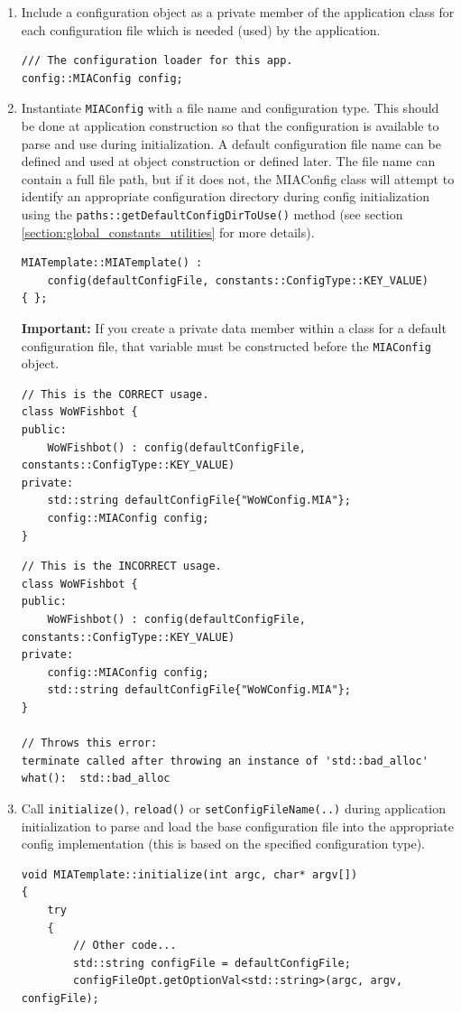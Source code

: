\begin{enumerate}
	\item Include a configuration object as a private member of the application class for each configuration file which is needed (used) by the application.
	\begin{lstlisting}[style=cppstyle]
/// The configuration loader for this app.
config::MIAConfig config;
	\end{lstlisting}
	\item Instantiate \texttt{MIAConfig} with a file name and configuration type. This should be done at application construction so that the configuration is available to parse and use during initialization. A default configuration file name can be defined and used at object construction or defined later. The file name can contain a full file path, but if it does not, the MIAConfig class will attempt to identify an appropriate configuration directory during config initialization using the \texttt{paths::getDefaultConfigDirToUse()} method (see section \ref{section:global_constants_utilities} for more details).
	\begin{lstlisting}[style=cppstyle]
MIATemplate::MIATemplate() : 
	config(defaultConfigFile, constants::ConfigType::KEY_VALUE)                      
{ };
	\end{lstlisting}
	\textbf{Important:} If you create a private data member within a class for a default configuration file, that variable must be constructed before the \texttt{MIAConfig} object.
	\begin{lstlisting}[style=cppstyle]
// This is the CORRECT usage.
class WoWFishbot {
public:
	WoWFishbot() : config(defaultConfigFile, constants::ConfigType::KEY_VALUE)
private:
	std::string defaultConfigFile{"WoWConfig.MIA"};
	config::MIAConfig config;
}
	\end{lstlisting}
	\begin{lstlisting}[style=cppstyle]
// This is the INCORRECT usage.
class WoWFishbot {
public:
	WoWFishbot() : config(defaultConfigFile, constants::ConfigType::KEY_VALUE)
private:
	config::MIAConfig config;
	std::string defaultConfigFile{"WoWConfig.MIA"};
}

// Throws this error:
terminate called after throwing an instance of 'std::bad_alloc'
what():  std::bad_alloc
	\end{lstlisting}
	\item Call \texttt{initialize()}, \texttt{reload()} or \texttt{setConfigFileName(..)} during application initialization to parse and load the base configuration file into the appropriate config implementation (this is based on the specified configuration type).
	\begin{lstlisting}[style=cppstyle]
void MIATemplate::initialize(int argc, char* argv[])
{
	try
	{    
		// Other code...
		std::string configFile = defaultConfigFile;
		configFileOpt.getOptionVal<std::string>(argc, argv, configFile);
		

\end{lstlisting}
\end{enumerate}
